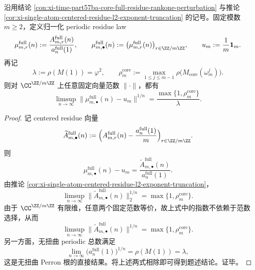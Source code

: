 \begin{theorem}\label{thm:xi-time-part65c-normalized-residue-law-exact-exponent}
沿用结论 \ref{con:xi-time-part57ba-core-full-residue-rankone-perturbation} 与推论 \ref{cor:xi-single-atom-centered-residue-l2-exponent-truncation} 的记号。固定模数 \(m\ge 2\)，定义归一化 periodic residue law
\[
\mu_{m,r}^{\mathrm{full}}(n)
:=
\frac{A_{m,r}^{\mathrm{full}}(n)}{a_n^{\mathrm{full}}(1)},
\qquad
\mu_{m,\bullet}^{\mathrm{full}}(n)
:=
\bigl(\mu_{m,r}^{\mathrm{full}}(n)\bigr)_{r\in\ZZ/m\ZZ},
\qquad
u_m:=\frac{1}{m}\mathbf 1_m.
\]
再记
\[
\lambda:=\rho(M(1))=\varphi^2,
\qquad
\rho_m^{\mathrm{core}}
:=
\max_{1\le j\le m-1}\rho\!\bigl(M_{\mathrm{core}}(\omega_m^j)\bigr).
\]
则对 \(\CC^{\ZZ/m\ZZ}\) 上任意固定向量范数 \(\|\cdot\|\)，都有
\[
\boxed{\;
\limsup_{n\to\infty}
\bigl\|
\mu_{m,\bullet}^{\mathrm{full}}(n)-u_m
\bigr\|^{1/n}
=
\frac{\max\{1,\rho_m^{\mathrm{core}}\}}{\lambda}.\;}
\]
\end{theorem}
\begin{proof}
记 centered residue 向量
\[
\widetilde A_{m,\bullet}^{\mathrm{full}}(n)
:=
\Bigl(
A_{m,r}^{\mathrm{full}}(n)-\frac{a_n^{\mathrm{full}}(1)}{m}
\Bigr)_{r\in\ZZ/m\ZZ}.
\]
则
\[
\mu_{m,\bullet}^{\mathrm{full}}(n)-u_m
=
\frac{\widetilde A_{m,\bullet}^{\mathrm{full}}(n)}{a_n^{\mathrm{full}}(1)}.
\]
由推论 \ref{cor:xi-single-atom-centered-residue-l2-exponent-truncation}，
\[
\limsup_{n\to\infty}
\bigl\|\widetilde A_{m,\bullet}^{\mathrm{full}}(n)\bigr\|_2^{1/n}
=
\max\{1,\rho_m^{\mathrm{core}}\}.
\]
由于 \(\CC^{\ZZ/m\ZZ}\) 有限维，任意两个固定范数等价，故上式中的指数不依赖于范数选择，从而
\[
\limsup_{n\to\infty}
\bigl\|\widetilde A_{m,\bullet}^{\mathrm{full}}(n)\bigr\|^{1/n}
=
\max\{1,\rho_m^{\mathrm{core}}\}.
\]
另一方面，无扭曲 periodic 总数满足
\[
\lim_{n\to\infty}\bigl(a_n^{\mathrm{full}}(1)\bigr)^{1/n}
=
\rho(M(1))
=
\lambda,
\]
这是无扭曲 Perron 根的直接结果。将上述两式相除即可得到题述结论。证毕。
\end{proof}

